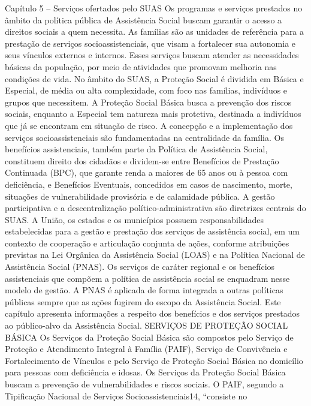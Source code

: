 \documentclass[
  brazilian]{report}
\begin{document}
Capítulo 5 -- Serviços ofertados pelo SUAS Os programas e serviços
prestados no âmbito da política pública de Assistência Social buscam
garantir o acesso a direitos sociais a quem necessita. As famílias são
as unidades de referência para a prestação de serviços
socioassistenciais, que visam a fortalecer sua autonomia e seus vínculos
externos e internos. Esses serviços buscam atender as necessidades
básicas da população, por meio de atividades que promovam melhoria nas
condições de vida. No âmbito do SUAS, a Proteção Social é dividida em
Básica e Especial, de média ou alta complexidade, com foco nas famílias,
indivíduos e grupos que necessitem. A Proteção Social Básica busca a
prevenção dos riscos sociais, enquanto a Especial tem natureza mais
protetiva, destinada a indivíduos que já se encontram em situação de
risco. A concepção e a implementação dos serviços socioassistenciais são
fundamentadas na centralidade da família. Os benefícios assistenciais,
também parte da Política de Assistência Social, constituem direito dos
cidadãos e dividem-se entre Benefícios de Prestação Continuada (BPC),
que garante renda a maiores de 65 anos ou à pessoa com deficiência, e
Benefícios Eventuais, concedidos em casos de nascimento, morte,
situações de vulnerabilidade provisória e de calamidade pública. A
gestão participativa e a descentralização político-administrativa são
diretrizes centrais do SUAS. A União, os estados e os municípios possuem
responsabilidades estabelecidas para a gestão e prestação dos serviços
de assistência social, em um contexto de cooperação e articulação
conjunta de ações, conforme atribuições previstas na Lei Orgânica da
Assistência Social (LOAS) e na Política Nacional de Assistência Social
(PNAS). Os serviços de caráter regional e os benefícios assistenciais
que compõem a política de assistência social se enquadram nesse modelo
de gestão. A PNAS é aplicada de forma integrada a outras políticas
públicas sempre que as ações fugirem do escopo da Assistência Social.
Este capítulo apresenta informações a respeito dos benefícios e dos
serviços prestados ao público-alvo da Assistência Social. SERVIÇOS DE
PROTEÇÃO SOCIAL BÁSICA Os Serviços da Proteção Social Básica são
compostos pelo Serviço de Proteção e Atendimento Integral à Família
(PAIF), Serviço de Convivência e Fortalecimento de Vínculos e pelo
Serviço de Proteção Social Básica no domicílio para pessoas com
deficiência e idosas. Os Serviços da Proteção Social Básica buscam a
prevenção de vulnerabilidades e riscos sociais. O PAIF, segundo a
Tipificação Nacional de Serviços Socioassistenciais14, ``consiste no
\end{document}
